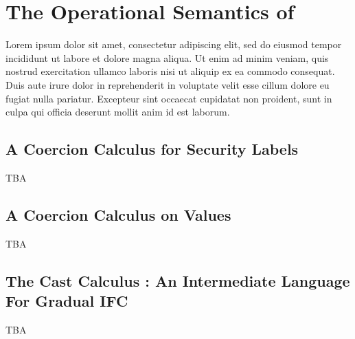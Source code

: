 \chapter{The Operational Semantics of \Surface}
\label{ch:coercion-calculus-labels}

Lorem ipsum dolor sit amet, consectetur adipiscing elit, sed do eiusmod tempor incididunt ut labore et dolore magna aliqua. Ut enim ad minim veniam, quis nostrud exercitation ullamco laboris nisi ut aliquip ex ea commodo consequat. Duis aute irure dolor in reprehenderit in voluptate velit esse cillum dolore eu fugiat nulla pariatur. Excepteur sint occaecat cupidatat non proident, sunt in culpa qui officia deserunt mollit anim id est laborum.

\section{A Coercion Calculus for Security Labels}

TBA

\section{A Coercion Calculus on Values}

TBA

\section{The Cast Calculus \CC: An Intermediate Language For Gradual IFC}

TBA
